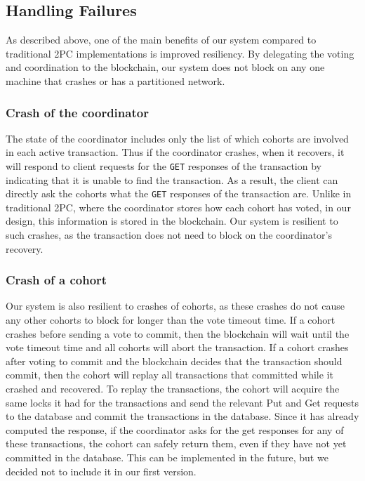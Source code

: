 \documentclass[11pt,conference]{IEEEtran}
\begin{document}
\subsection{Handling Failures} \label{failurecases}
As described above, one of the main benefits of our system compared to traditional 2PC implementations is improved resiliency. By delegating the voting and coordination to the blockchain, our system does not block on any one machine that crashes or has a partitioned network.

\subsubsection{Crash of the coordinator}
The state of the coordinator includes only the list of which cohorts are involved in each active transaction. Thus if the coordinator crashes, when it recovers, it will respond to client requests for the \texttt{GET} responses of the transaction by indicating that it is unable to find the transaction. As a result, the client can directly ask the cohorts what the \texttt{GET} responses of the transaction are. Unlike in traditional 2PC, where the coordinator stores how each cohort has voted, in our design, this information is stored in the blockchain. Our system is resilient to such crashes, as the transaction does not need to block on the coordinator’s recovery.

\subsubsection{Crash of a cohort}
Our system is also resilient to crashes of cohorts, as these crashes do not cause any other cohorts to block for longer than the vote timeout time.  If a cohort crashes before sending a vote to commit, then the blockchain will wait until the vote timeout time and all cohorts will abort the transaction. If a cohort crashes after voting to commit and the blockchain decides that the transaction should commit, then the cohort will replay all transactions that committed while it crashed and recovered. To replay the transactions, the cohort will acquire the same locks it had for the transactions and send the relevant Put and Get requests to the database and commit the transactions in the database. Since it has already computed the response, if the coordinator asks for the get responses for any of these transactions, the cohort can safely return them, even if they have not yet committed in the database. This can be implemented in the future, but we decided not to include it in our first version. 
\end{document}
